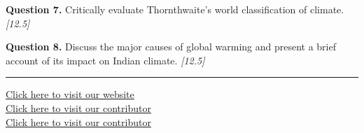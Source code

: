 \documentclass[11pt,a4paper]{article}
\newcommand{\pts}[1]{\hfill   \textit{[#1]}}
\begin{document}
\medskip


\noindent   \textbf{Question 7.} Critically evaluate Thornthwaite's world classification of climate. \pts{12.5}

\medskip


\noindent   \textbf{Question 8.} Discuss the major causes of global warming and present a brief account of its impact on Indian climate. \pts{12.5}

\vfill\rule{\linewidth}{0.4pt}

\begin{center}\small
\href{https://bhu-exam.vercel.app/}{Click here to visit our website}\\[4pt]
\href{https://me-aryan.vercel.app/}{Click here to visit our contributor}\\[4pt]
\href{https://quashan-me.vercel.app/}{Click here to visit our contributor}
\end{center}
\end{document}
